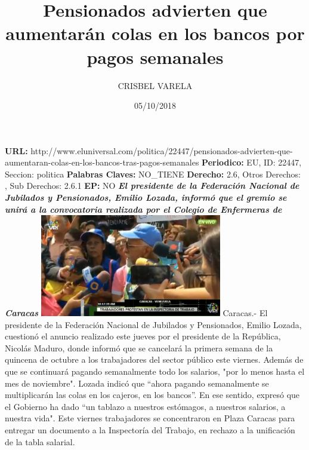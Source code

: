\documentclass{article}%
\title{\textbf{Pensionados advierten que aumentarán colas en los bancos por pagos semanales}}%
\author{CRISBEL VARELA}%
\date{05/10/2018}%
\begin{document}
%
\normalsize%
\maketitle%
\textbf{URL: }%
http://www.eluniversal.com/politica/22447/pensionados{-}advierten{-}que{-}aumentaran{-}colas{-}en{-}los{-}bancos{-}tras{-}pagos{-}semanales\newline%
%
\textbf{Periodico: }%
EU, %
ID: %
22447, %
Seccion: %
politica\newline%
%
\textbf{Palabras Claves: }%
NO\_TIENE\newline%
%
\textbf{Derecho: }%
2.6, %
Otros Derechos: %
, %
Sub Derechos: %
2.6.1\newline%
%
\textbf{EP: }%
NO\newline%
\newline%
%
\textbf{\textit{El presidente de la Federación Nacional de Jubilados y Pensionados,  Emilio Lozada, informó que el gremio se unirá a la convocatoria realizada por el Colegio de Enfermeras de Caracas}}%
\newline%
\newline%
%
\includegraphics[width=300px]{201.jpg}%
\newline%
%
Caracas.{-} El presidente de la Federación Nacional de Jubilados y Pensionados, Emilio Lozada, cuestionó el anuncio realizado este jueves por el presidente de la República, Nicolás Maduro, donde informó que se cancelará la primera semana de la quincena de octubre a los trabajadores del sector público este viernes. Además de que se continuará pagando semanalmente todo los salarios, "por lo menos hasta el mes de noviembre".%
\newline%
%
Lozada indicó que “ahora pagando semanalmente se multiplicarán las colas en los cajeros, en los bancos”.%
\newline%
%
En ese sentido, expresó que el Gobierno ha dado “un tablazo a nuestros estómagos, a nuestros salarios, a nuestra vida".%
\newline%
%
Este viernes trabajadores se concentraron en Plaza Caracas para entregar un documento a la Inspectoría del Trabajo, en rechazo a la unificación de la tabla salarial.%
\end{document}
